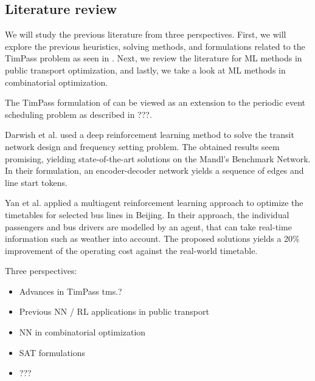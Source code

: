 \documentclass[english, 12pt, a4paper, sci, utf8, a-2b, online]{aaltothesis}
\begin{document}
\subsection{Literature review}


We will study the previous literature from three perspectives. First, we will explore the previous heuristics, solving methods, and formulations related to the TimPass problem as seen in \cite{schmidt2014integrating, schiewe2020periodic}. Next, we review the literature for ML methods in public transport optimization, and lastly, we take a look at ML methods in combinatorial optimization.

The TimPass formulation of \cite{schiewe2020periodic} can be viewed as an extension to the periodic event scheduling problem as described in ???. 


Darwish et al. \cite{darwish2020optimising} used a deep reinforcement learning method to solve the transit network design and frequency setting problem. The obtained results seem promising, yielding state-of-the-art solutions on the Mandl's Benchmark Network. In their formulation, an encoder-decoder network yields a sequence of edges and line start tokens.

Yan et al. \cite{yan2022distributed} applied a multiagent reinforcement learning approach to optimize the timetables for selected bus lines in Beijing. In their approach, the individual passengers and bus drivers are modelled by an agent, that can take real-time information such as weather into account. The proposed solutions yields a 20\% improvement of the operating cost against the real-world timetable.






Three perspectives:
\begin{itemize}
        \item Advances in TimPass tms.?
        \item Previous NN / RL applications in public transport
        \item NN in combinatorial optimization
\end{itemize}

\begin{itemize}
    \item SAT formulations
    \item ???
\end{itemize}
\end{document}

